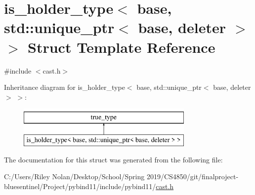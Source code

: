 \hypertarget{structis__holder__type_3_01base_00_01std_1_1unique__ptr_3_01base_00_01deleter_01_4_01_4}{}\section{is\+\_\+holder\+\_\+type$<$ base, std\+::unique\+\_\+ptr$<$ base, deleter $>$ $>$ Struct Template Reference}
\label{structis__holder__type_3_01base_00_01std_1_1unique__ptr_3_01base_00_01deleter_01_4_01_4}


{\ttfamily \#include $<$cast.\+h$>$}

Inheritance diagram for is\+\_\+holder\+\_\+type$<$ base, std\+::unique\+\_\+ptr$<$ base, deleter $>$ $>$\+:\begin{figure}[H]
\begin{center}
\leavevmode
\includegraphics[height=2.000000cm]{structis__holder__type_3_01base_00_01std_1_1unique__ptr_3_01base_00_01deleter_01_4_01_4}
\end{center}
\end{figure}


The documentation for this struct was generated from the following file\+:\begin{DoxyCompactItemize}
\item 
C\+:/\+Users/\+Riley Nolan/\+Desktop/\+School/\+Spring 2019/\+C\+S4850/git/finalproject-\/bluesentinel/\+Project/pybind11/include/pybind11/\mbox{\hyperlink{cast_8h}{cast.\+h}}\end{DoxyCompactItemize}
